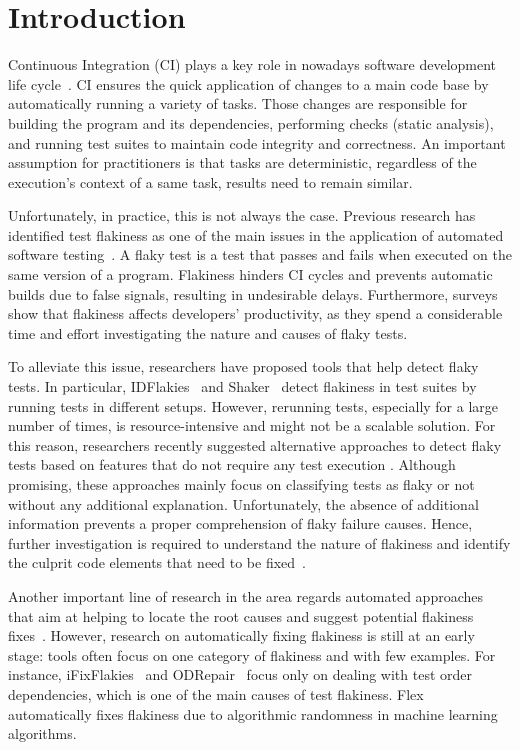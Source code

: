 \section{Introduction}
\label{sec:flakycat-introduction}

Continuous Integration (CI) plays a key role in nowadays software development life cycle~\cite{shahin2017continuous, CI}. 
CI ensures the quick application of changes to a main code base by automatically running a variety of tasks. Those changes are responsible for building the program and its dependencies, performing checks (\eg static analysis), and running test suites to maintain code integrity and correctness. An important assumption for practitioners is that tasks are deterministic, \ie regardless of the execution's context of a same task, results need to remain similar. 

Unfortunately, in practice, this is not always the case. Previous research has identified test flakiness as one of the main issues in the application of automated software testing~\cite{Micco2017,LeongSPTM19, memon2017taming}. A flaky test is a test that passes and fails when executed on the same version of a program. Flakiness hinders CI cycles and prevents automatic builds due to false signals, resulting in undesirable delays. Furthermore, surveys~\cite{Habchi2022Qualitative, Eck2019, gruber2022survey} show that flakiness affects developers' productivity, as they spend a considerable time and effort investigating the nature and causes of flaky tests. 

To alleviate this issue, researchers have proposed tools that help detect flaky tests. In particular, IDFlakies~\cite{Lam2019iDFlakies} and Shaker~\cite{Silva2020} detect flakiness in test suites by running tests in different setups. However, rerunning tests, especially for a large number of times, is resource-intensive and might not be a scalable solution. For this reason, researchers recently suggested alternative approaches to detect flaky tests based on features that do not require any test execution \cite{LeongSPTM19,King2018,Pinto2020,camara2021use}. Although promising, these approaches mainly focus on classifying tests as flaky or not without any additional explanation. Unfortunately, the absence of additional information prevents a proper comprehension of flaky failure causes. Hence, further investigation is required to understand the nature of flakiness and identify the culprit code elements that need to be fixed~\cite{Eck2019}.

Another important line of research in the area regards automated approaches that aim at helping to locate the root causes and suggest potential flakiness fixes~\cite{ziftci2020flake,Lam2019RootCausing,flakyloc}. However, research on automatically fixing flakiness is still at an early stage: tools often focus on one category of flakiness and with few examples. For instance, iFixFlakies~\cite{Shi2019iFix} and ODRepair~\cite{li2022repairing} focus only on dealing with test order dependencies, which is one of the main causes of test flakiness. Flex~\cite{Dutta2020} automatically fixes flakiness due to algorithmic randomness in machine learning algorithms. 


